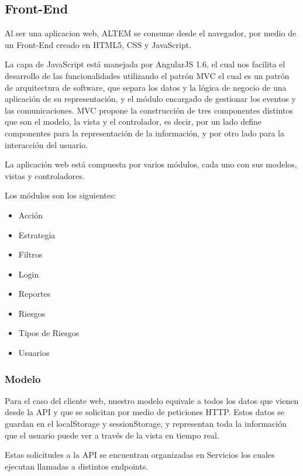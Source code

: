 \subsection{Front-End}
Al ser una aplicacion web, ALTEM se consume desde el navegador, por medio de un Front-End creado en HTML5, CSS y JavaScript.

La capa de JavaScript está manejada por AngularJS 1.6, el cual nos facilita el desarrollo de las funcionalidades utilizando el patrón MVC el cual es un patrón de arquitectura de software, que separa los datos y la lógica de negocio de una aplicación de su representación, y el módulo encargado de gestionar los eventos y las comunicaciones.
MVC propone la construcción de tres componentes distintos que son el modelo, la vista y el controlador, es decir, por un lado define componentes para la representación de la información, y por otro lado para la interacción del usuario.\cite{trygve}

La aplicación web está compuesta por varios módulos, cada uno con sus modelos, vistas y controladores.

Los módulos son los siguientes:

\begin{itemize}
    \item Acción
    \item Estrategia
    \item Filtros
    \item Login
    \item Reportes
    \item Riesgos
    \item Tipos de Riesgos
    \item Usuarios
\end{itemize}

\subsubsection{Modelo}
Para el caso del cliente web, nuestro modelo equivale a todos los datos que vienen desde la API y que se solicitan por medio de peticiones HTTP. Estos datos se guardan en el localStorage y sessionStorage, y representan toda la información que el usuario puede ver a través de la vista en tiempo real.

Estas solicitudes a la API se encuentran organizadas en Servicios\cite{servicios} los cuales ejecutan llamadas a distintos endpoints\cite{endpoints}.

